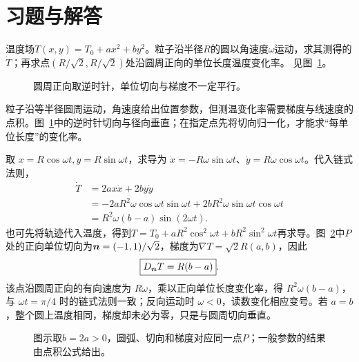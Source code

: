 \section{习题与解答}

\begin{exercise}[圆周上的方向变化率]\label{ex:c3-h1}
温度场$T(x,y)=T_0+ax^2+by^2$。粒子沿半径$R$的圆以角速度$\omega$运动，求其测得的$\dot T$；再求点$(R/\sqrt2,R/\sqrt2)$处沿圆周正向的单位长度温度变化率。 见图~\ref{fig:c3-h1-q}。
\end{exercise}

\begin{figure}[H]\centering
{}
\caption{圆周正向取逆时针，单位切向与梯度不一定平行。}\label{fig:c3-h1-q}
\end{figure}
\begin{solution}
粒子沿等半径圆周运动，角速度给出位置参数，但测温变化率需要梯度与线速度的点积。图~\ref{fig:c3-h1-q}中的逆时针切向与径向垂直；在指定点先将切向归一化，才能求“每单位长度”的变化率。


取 $x=R\cos\omega t,y=R\sin\omega t$，求导为 $\dot x=-R\omega\sin\omega t$、$\dot y=R\omega\cos\omega t$。代入链式法则，
\[
\begin{aligned}
\dot T&=2ax\dot x+2by\dot y\\
&=-2aR^2\omega\cos\omega t\sin\omega t+2bR^2\omega\sin\omega t\cos\omega t\\
&=R^2\omega(b-a)\sin(2\omega t).
\end{aligned}
\]
也可先将轨迹代入温度，得到$T=T_0+aR^2\cos^2\omega t+bR^2\sin^2\omega t$再求导。图~\ref{fig:c3-h1-s}中$P$处的正向单位切向为$\bm{n}=(-1,1)/\sqrt2$，梯度为$\nabla T=\sqrt2R(a,b)$，因此
\[\boxed{D_{\bm{n}}T=R(b-a)}.
\]
该点沿圆周正向的有向速度为 $R\omega$，乘以正向单位长度变化率，得 $R^2\omega(b-a)$，与 $\omega t=\pi/4$ 时的链式法则一致；反向运动时 $\omega<0$，读数变化相应变号。若 $a=b$，整个圆上温度相同，梯度却未必为零，只是与圆周切向垂直。



\begin{figure}[H]\centering
{}
\caption{图示取$b=2a>0$，圆弧、切向和梯度对应同一点$P$；一般参数的结果由点积公式给出。}\label{fig:c3-h1-s}
\end{figure}
\end{solution}


